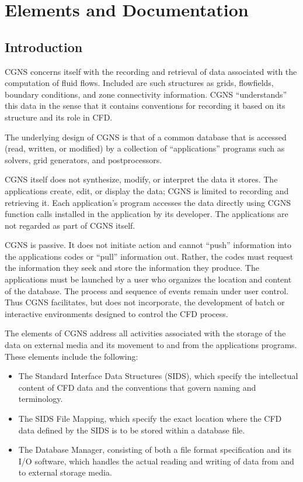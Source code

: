 \section{Elements and Documentation}
\label{s:elements}
\thispagestyle{plain}

\subsection{Introduction}

CGNS concerns itself with the recording and retrieval of data associated
with the computation of fluid flows.
Included are such structures as grids, flowfields, boundary conditions,
and zone connectivity information.
CGNS ``understands'' this data in the sense that it contains conventions
for recording it based on its structure and its role in CFD.

The underlying design of CGNS is that of a common database that is
accessed (read, written, or modified) by a collection of ``applications''
programs such as solvers, grid generators, and postprocessors.

CGNS itself does not synthesize, modify, or interpret the data it
stores.
The applications create, edit, or display the data; CGNS is limited to
recording and retrieving it.
Each application's program accesses the data directly using CGNS
function calls installed in the application by its developer.
The applications are not regarded as part of CGNS itself.

CGNS is passive.
It does not initiate action and cannot ``push'' information into the
applications codes or ``pull'' information out.
Rather, the codes must request the information they seek and store the
information they produce.
The applications must be launched by a user who organizes the location
and content of the database.
The process and sequence of events remain under user control.
Thus CGNS facilitates, but does not incorporate, the development of
batch or interactive environments designed to control the CFD process.

The elements of CGNS address all activities associated with the
storage of the data on external media and its movement to and from the
applications programs.
These elements include the following:

\begin{itemize}
\item The Standard Interface Data Structures (SIDS), which specify the
      intellectual content of CFD data and the conventions that govern
      naming and terminology.
\item The SIDS File Mapping,
      which specify the exact location where the CFD
      data defined by the SIDS is to be stored within a database file.
\item The Database Manager, consisting
      of both a file format specification and its I/O software, which
      handles the actual reading and writing of data from and to
      external storage media.
\end{itemize}

